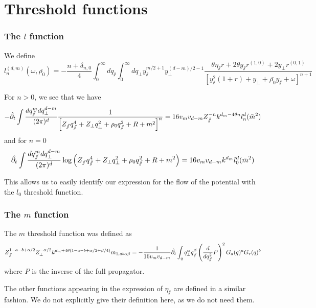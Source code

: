 \label{app:thresholds}
\chapter{Threshold functions}

\subsection{The $l$ function}
We define
\begin{equation}
l_n^{(d,m)}(\omega, \bar{\rho_0}) = -\frac{n+\delta_{n,0}}{4} \int_0^{\infty} dq_\sslash \int_0^{\infty} dq_\perp y_\sslash^{m/2+1} y_\perp^{(d-m)/2-1} \frac{\theta \eta_\sslash r + 2 \theta y_\sslash r^{(1,0)}+ 2 y_\perp r^{(0,1)}}{\left[y_\sslash^2(1+r) + y_\perp + \bar{\rho_0} y_\sslash + \omega\right]^{n+1}}
\end{equation}

For $n>0$, we see that we have
\begin{equation}
-\hat{\partial_{t}} \int \frac{dq_\sslash^{m} dq_\perp^{d-m}}{(2\pi)^d} \frac{1}{\left[ Z_\sslash q_\sslash^4 + Z_\perp q_\perp^2 + \rho_0 q_\sslash^2 + R + m^2 \right]^{n}} = 16 v_m v_{d-m} Z_\sslash^{-n} k^{d_m-4\theta n} l_n^{d}(\bar{m}^2)
\end{equation}
and for $n=0$
\begin{equation}
\hat{\partial_{t}} \int \frac{dq_\sslash^{m} dq_\perp^{d-m}}{(2\pi)^d} \log{ \left( Z_\sslash q_\sslash^4 + Z_\perp q_\perp^2 + \rho_0 q_\sslash^2 + R + m^2 \right) } = 16 v_m v_{d-m} k^{d_m} l_0^{d}(\bar{m}^2)
\end{equation}

This allows us to easily identify our expression for the flow of the potential with the $l_0$ threshold function.

\subsection{The $m$ function}
The $m$ threshold function was defined as
\begin{equation}
Z_\sslash^{1-a-b+\alpha/2} Z_\perp^{-\alpha/2} k^{d_m + 4\theta(1-a-b+\alpha/2+\beta/4)} m_{1,ab\alpha \beta} = -\frac{1}{16 v_m v_{d-m}} \hat{\partial_{t}} \int_q q_\perp^\alpha q_\sslash^\beta \left(\frac{d}{d q_\sslash^2} P\right)^2 G_a(q)^a G_r(q)^b
\end{equation}
where $P$ is the inverse of the full propagator.

The other functions appearing in the expression of $\eta_\sslash$ are defined in a similar fashion. We do not explicitly give their definition here, as we do not need them.